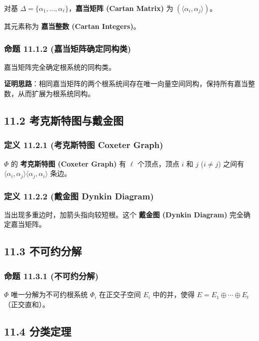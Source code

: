对基 $\Delta = \{\alpha_1, \ldots, \alpha_\ell\}$，\textbf{嘉当矩阵 (Cartan Matrix)} 为 $(\langle\alpha_i, \alpha_j\rangle)$。

其元素称为 \textbf{嘉当整数 (Cartan Integers)}。

\subsubsection{命题 11.1.2 (嘉当矩阵确定同构类)}

嘉当矩阵完全确定根系统的同构类。

\textbf{证明思路}：相同嘉当矩阵的两个根系统间存在唯一向量空间同构，保持所有嘉当整数，从而扩展为根系统同构。

\subsection{11.2 考克斯特图与戴金图}

\subsubsection{定义 11.2.1 (考克斯特图 Coxeter Graph)}

$\Phi$ 的 \textbf{考克斯特图 (Coxeter Graph)} 有 $\ell$ 个顶点，顶点 $i$ 和 $j$ ($i \neq j$) 之间有 $\langle\alpha_i, \alpha_j\rangle\langle\alpha_j, \alpha_i\rangle$ 条边。

\subsubsection{定义 11.2.2 (戴金图 Dynkin Diagram)}

当出现多重边时，加箭头指向较短根。这个 \textbf{戴金图 (Dynkin Diagram)} 完全确定嘉当矩阵。

\subsection{11.3 不可约分解}

\subsubsection{命题 11.3.1 (不可约分解)}

$\Phi$ 唯一分解为不可约根系统 $\Phi_i$ 在正交子空间 $E_i$ 中的并，使得 $E = E_1 \oplus \cdots \oplus E_t$（正交直和）。

\subsection{11.4 分类定理}

